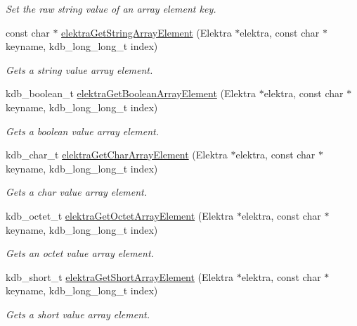 \begin{DoxyCompactItemize}
\begin{DoxyCompactList}\small\item\em Set the raw string value of an array element key. \end{DoxyCompactList}\item 
const char $\ast$ \mbox{\hyperlink{group__highlevel_gaf445216facccfc7ad6740b594e7a8f6e}{elektra\+Get\+String\+Array\+Element}} (Elektra $\ast$elektra, const char $\ast$keyname, kdb\+\_\+long\+\_\+long\+\_\+t index)
\begin{DoxyCompactList}\small\item\em Gets a string value array element. \end{DoxyCompactList}\item 
kdb\+\_\+boolean\+\_\+t \mbox{\hyperlink{group__highlevel_ga3b9f1f569c63be91d4211bafd0aae249}{elektra\+Get\+Boolean\+Array\+Element}} (Elektra $\ast$elektra, const char $\ast$keyname, kdb\+\_\+long\+\_\+long\+\_\+t index)
\begin{DoxyCompactList}\small\item\em Gets a boolean value array element. \end{DoxyCompactList}\item 
kdb\+\_\+char\+\_\+t \mbox{\hyperlink{group__highlevel_gacb11d0dbaaa6acbd6c16004a97ccd721}{elektra\+Get\+Char\+Array\+Element}} (Elektra $\ast$elektra, const char $\ast$keyname, kdb\+\_\+long\+\_\+long\+\_\+t index)
\begin{DoxyCompactList}\small\item\em Gets a char value array element. \end{DoxyCompactList}\item 
kdb\+\_\+octet\+\_\+t \mbox{\hyperlink{group__highlevel_ga2c67031aef8c34c639ec56b87006386d}{elektra\+Get\+Octet\+Array\+Element}} (Elektra $\ast$elektra, const char $\ast$keyname, kdb\+\_\+long\+\_\+long\+\_\+t index)
\begin{DoxyCompactList}\small\item\em Gets an octet value array element. \end{DoxyCompactList}\item 
kdb\+\_\+short\+\_\+t \mbox{\hyperlink{group__highlevel_ga5f078052ece43a36fe247515ada74a7d}{elektra\+Get\+Short\+Array\+Element}} (Elektra $\ast$elektra, const char $\ast$keyname, kdb\+\_\+long\+\_\+long\+\_\+t index)
\begin{DoxyCompactList}\small\item\em Gets a short value array element. \end{DoxyCompactList}\item 

\end{DoxyCompactItemize}
